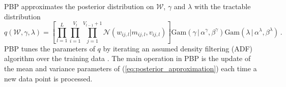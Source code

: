 PBP approximates the posterior distribution on $\mathcal{W}$, $\gamma$ and $\lambda$ with the tractable distribution
\begin{equation}
q(\mathcal{W},\gamma, \lambda) = \left[ \prod_{l=1}^L\! \prod_{i=1}^{V_l}\! 
\prod_{j=1}^{V_{l\!-\!1}\!+\!1} \mathcal{N}(w_{ij,l}| m_{ij,l},v_{ij,l})\right ]
 \text{Gam}(\gamma \,|\, \alpha^\gamma, \beta^\gamma)
\text{Gam}(\lambda \,|\, \alpha^\lambda, \beta^\lambda)\,.\label{eq:posterior_approximation}
\end{equation}
PBP tunes the parameters of $q$ by iterating an assumed
density filtering (ADF) algorithm over the training data \cite{opper1998bayesian}. The main operation in PBP
is the update of the mean and variance parameters of (\ref{eq:posterior_approximation})
each time a new data point is processed. 

